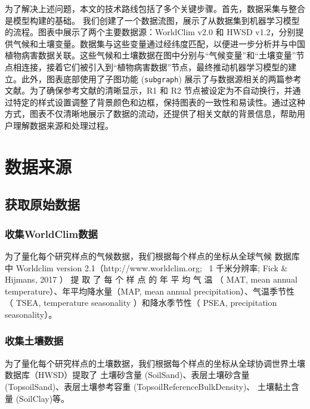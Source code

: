\documentclass[AutoFakeBold]{LZUThesis-PgD&PhD}
\begin{document}
	
		为了解决上述问题，本文的技术路线包括了多个关键步骤。首先，数据采集与整合是模型构建的基础。
		我们创建了一个数据流图，展示了从数据集到机器学习模型的流程。图表中展示了两个主要数据源：WorldClim v2.0 和 HWSD v1.2，分别提供气候和土壤变量。数据集与这些变量通过经纬度匹配，以便进一步分析并与中国植物病害数据关联。这些气候和土壤数据在图中分别与“气候变量”和“土壤变量”节点相连接，接着它们被引入到“植物病害数据”节点，最终推动机器学习模型的建立。此外，图表底部使用了子图功能 (\texttt{subgraph}) 展示了与数据源相关的两篇参考文献。为了确保参考文献的清晰显示，R1 和 R2 节点被设定为不自动换行，并通过特定的样式设置调整了背景颜色和边框，保持图表的一致性和易读性。通过这种方式，图表不仅清晰地展示了数据的流动，还提供了相关文献的背景信息，帮助用户理解数据来源和处理过程。
		
		
		
%			
%			
%			
	\chapter{数据来源}
	\section{获取原始数据}
	\subsection{收集WorldClim数据}
	
	为了量化每个研究样点的气候数据，我们根据每个样点的坐标从全球气候
	数据库中 Worldclim version 2.1（http://www.worldclim.org; ~1 千米分辨率; Fick 
	\& Hijmans, 2017 ） 提 取 了 每 个 样 点 的 年 平 均 气 温 （ MAT, mean annual 
	temperature）、年平均降水量（MAP, mean annual precipitation）、气温季节性
	（ TSEA, temperature seasonality ）和降水季节性（ PSEA, precipitation 
	seasonality）。
	
	\subsection{收集土壤数据}
	为了量化每个研究样点的土壤数据，我们根据每个样点的坐标从全球协调世界土壤数据库（HWSD）提取了
	土壤砂含量 (SoilSand)、表层土壤砂含量 (TopsoilSand)、表层土壤参考容重 (TopsoilReferenceBulkDensity)、
	土壤黏土含量 (SoilClay)等。
	
\end{document}
